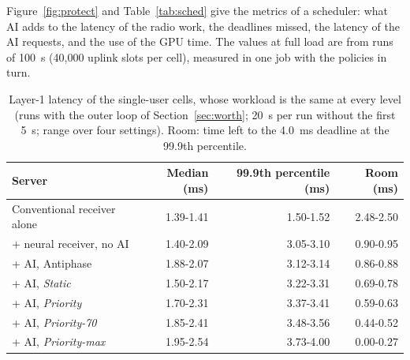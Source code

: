 \documentclass[acmsmall,screen,review,anonymous]{acmart}
\newcommand{\sys}{Antiphase\xspace}
\begin{document}
Figure~\ref{fig:protect} and Table~\ref{tab:sched} give the metrics of a scheduler: what AI adds to the
latency of the radio work, the deadlines missed, the latency of the AI requests, and the use of the GPU time.
The values at full load are from runs of 100~s (40,000 uplink slots per cell), measured in one job with the
policies in turn.

\begin{table}[t]
\caption{Layer-1 latency of the single-user cells, whose workload is the same at every level (runs with the
outer loop of Section~\ref{sec:worth}; 20~s per run without the first 5~s; range over four settings). Room:
time left to the 4.0~ms deadline at the 99.9th percentile.}
\label{tab:levels}
\footnotesize
\begin{tabular}{@{}lrrr@{}}
\toprule
Server & Median (ms) & 99.9th percentile (ms) & Room (ms) \\
\midrule
Conventional receiver alone & 1.39-1.41 & 1.50-1.52 & 2.48-2.50 \\
+ neural receiver, no AI & 1.40-2.09 & 3.05-3.10 & 0.90-0.95 \\
+ AI, \sys & 1.88-2.07 & 3.12-3.14 & 0.86-0.88 \\
+ AI, \textit{Static} & 1.50-2.17 & 3.22-3.31 & 0.69-0.78 \\
+ AI, \textit{Priority} & 1.70-2.31 & 3.37-3.41 & 0.59-0.63 \\
+ AI, \textit{Priority-70} & 1.85-2.41 & 3.48-3.56 & 0.44-0.52 \\
+ AI, \textit{Priority-max} & 1.95-2.54 & 3.73-4.00 & 0.00-0.27 \\
\bottomrule
\end{tabular}
\end{table}
\end{document}
